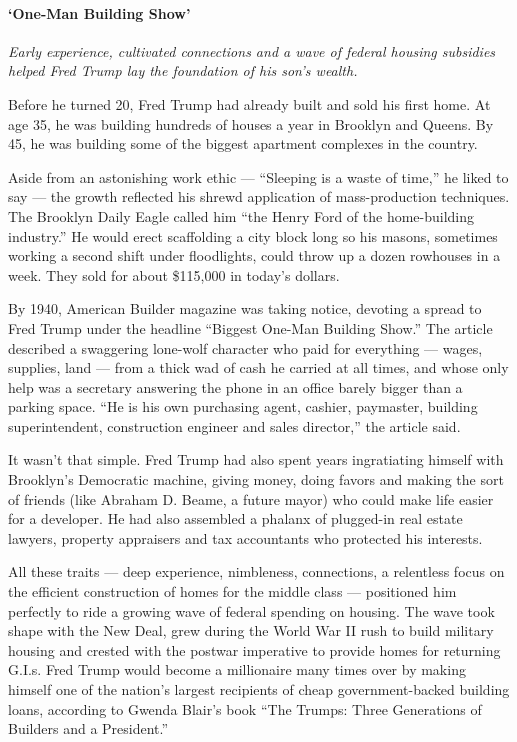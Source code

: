 \hypertarget{one-man-building-show}{%
\paragraph{`One-Man Building Show'}\label{one-man-building-show}}

\emph{Early experience, cultivated connections and a wave of federal
housing subsidies helped Fred Trump lay the foundation of his son's
wealth.}

Before he turned 20, Fred Trump had already built and sold his first
home. At age 35, he was building hundreds of houses a year in Brooklyn
and Queens. By 45, he was building some of the biggest apartment
complexes in the country.

Aside from an astonishing work ethic --- ``Sleeping is a waste of
time,'' he liked to say --- the growth reflected his shrewd application
of mass-production techniques. The Brooklyn Daily Eagle called him ``the
Henry Ford of the home-building industry.'' He would erect scaffolding a
city block long so his masons, sometimes working a second shift under
floodlights, could throw up a dozen rowhouses in a week. They sold for
about \$115,000 in today's dollars.

By 1940, American Builder magazine was taking notice, devoting a spread
to Fred Trump under the headline ``Biggest One-Man Building Show.'' The
article described a swaggering lone-wolf character who paid for
everything --- wages, supplies, land --- from a thick wad of cash he
carried at all times, and whose only help was a secretary answering the
phone in an office barely bigger than a parking space. ``He is his own
purchasing agent, cashier, paymaster, building superintendent,
construction engineer and sales director,'' the article said.

It wasn't that simple. Fred Trump had also spent years ingratiating
himself with Brooklyn's Democratic machine, giving money, doing favors
and making the sort of friends (like Abraham D. Beame, a future mayor)
who could make life easier for a developer. He had also assembled a
phalanx of plugged-in real estate lawyers, property appraisers and tax
accountants who protected his interests.

All these traits --- deep experience, nimbleness, connections, a
relentless focus on the efficient construction of homes for the middle
class --- positioned him perfectly to ride a growing wave of federal
spending on housing. The wave took shape with the New Deal, grew during
the World War II rush to build military housing and crested with the
postwar imperative to provide homes for returning G.I.s. Fred Trump
would become a millionaire many times over by making himself one of the
nation's largest recipients of cheap government-backed building loans,
according to Gwenda Blair's book ``The Trumps: Three Generations of
Builders and a President.''

